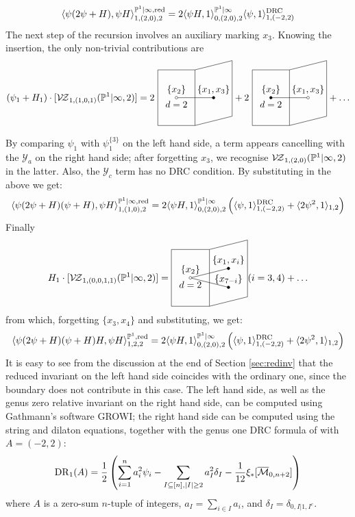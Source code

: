 \begin{ex}
\[\langle \psi(2\psi +H),\psi H\rangle^{\mathbb P^1|\infty,\rm{red}}_{1,(2,0),2}=2\langle \psi H,1\rangle^{\mathbb P^1|\infty}_{0,(2,0),2}\langle\psi,1\rangle^{\rm{DRC}}_{1,(-2,2)}\]
The next step of the recursion involves an auxiliary marking $x_3$. Knowing the insertion, the only non-trivial contributions are
 \begin{multline*} (\psi_1+H_1)\cdot [\VZ{(1,0,1)}{\PP^1|\infty}{2}]= 2\ {\tikz[baseline=-3pt,scale=.7]{
\draw (2,0) node[above]{$\{x_1,x_3\}$} -- (0,0)node[above]{$\{x_2\}$} node[below]{$d=2$};
\draw (2,0) circle(2pt)[fill=black];
\draw (0,0) circle(2pt)[fill=white];
\draw (-1,1.5) -- (1,1.5) -- (1,-1.5) -- (-1,-1.5) -- (-1,1.5);
\draw (1,1.5) -- (3,2) -- (3,-1) -- (1,-1.5);
}}+
2\ {\tikz[baseline=-3pt,scale=.7]{
\draw (2,0) node[above]{$\{x_1,x_3\}$} -- (0,0)node[above]{$\{x_2\}$} node[below]{$d=2$};
\draw (2,0) circle(2pt)[fill=white];
\draw (0,0) circle(2pt)[fill=black];
\draw (-1,1.5) -- (1,1.5) -- (1,-1.5) -- (-1,-1.5) -- (-1,1.5);
\draw (1,1.5) -- (3,2) -- (3,-1) -- (1,-1.5);
}}+\ldots
\end{multline*}

By comparing $\psi_1$ with $\psi_1^{\{3\}}$ on the left hand side, a term appears cancelling with the $\mathcal Y_a$ on the right hand side; after forgetting $x_3$, we recognise $\mathcal{V\!Z}_{1,(2,0)}(\mathbb P^1|\infty,2)$ in the latter. Also, the $\mathcal Y_c$ term has no DRC condition. By substituting in the above we get:
\[\langle \psi(2\psi +H)(\psi+H),\psi H\rangle^{\mathbb P^1|\infty,\rm{red}}_{1,(1,0),2}=2\langle \psi H,1\rangle^{\mathbb P^1|\infty}_{0,(2,0),2}\left(\langle\psi,1\rangle^{\rm{DRC}}_{1,(-2,2)}+\langle2\psi^2,1\rangle_{1,2}\right)\]
Finally
\[H_1\cdot[\VZ{(0,0,1,1)}{\PP^1|\infty}{2}]={\tikz[baseline=-3pt,scale=.7]{
\draw (2,.5) node[above]{$\{x_1,x_i\}$} -- (0,0)node[above]{$\{x_2\}$} node[below]{$d=2$}  (2,-.5)node[above]{$\{x_{7-i}\}$} -- (0,0);
\draw (2,.5) circle(2pt)[fill=black];
\draw (2,-.5) circle(2pt)[fill=black];
\draw (0,0) circle(2pt)[fill=white];
\draw (-1,1.5) -- (1,1.5) -- (1,-1.5) -- (-1,-1.5) -- (-1,1.5);
\draw (1,1.5) -- (3,2) -- (3,-1) -- (1,-1.5);
}} (i=3,4) +\ldots\]
from which, forgetting $\{x_3,x_4\}$ and substituting, we get:
\[\langle \psi(2\psi +H)(\psi+H)H,\psi H\rangle^{\mathbb P^1,\rm{red}}_{1,2,2}=2\langle \psi H,1\rangle^{\mathbb P^1|\infty}_{0,(2,0),2}\left(\langle\psi,1\rangle^{\rm{DRC}}_{1,(-2,2)}+\langle2\psi^2,1\rangle_{1,2}\right)\]
It is easy to see from the discussion at the end of Section \ref{sec:redinv} that the reduced invariant on the left hand side coincides with the ordinary one, since the boundary does not contribute in this case. The left hand side, as well as the genus zero relative invariant on the right hand side, can be computed using Gathmann's software GROWI; the right hand side can be computed using the string and dilaton equations, together with the genus one DRC formula of \cite[\S 0.5.2]{JPPZ} with $A=(-2,2)$:
\[\operatorname{DR}_1(A)=\frac{1}{2}\left(\sum_{i=1}^n a_i^2\psi_i-\sum_{I\subseteq [n],\lvert I\rvert\geq2}a_I^2\delta_I-\frac{1}{12}\xi_*[\overline{\mathcal{M}}_{0,n+2}]\right)\]
where $A$ is a zero-sum $n$-tuple of integers, $a_I=\sum_{i\in I}a_i$, and $\delta_I=\delta_{0,I|1,I^c}$.
\end{ex}

